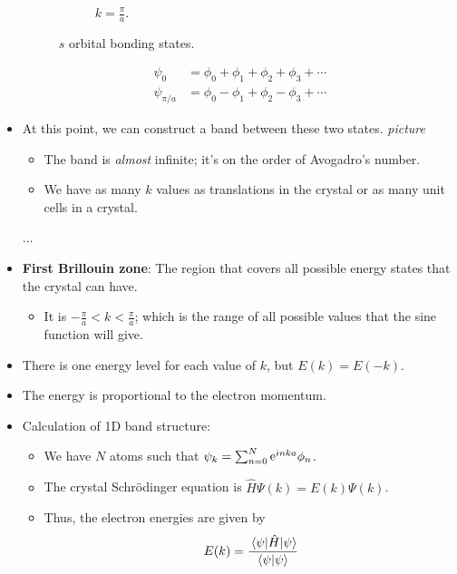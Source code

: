 \documentclass[../notes.tex]{subfiles}
\begin{document}
\begin{itemize}
\begin{figure}[h!]
\begin{subfigure}[b]{0.35\linewidth}
            \caption{$k=\frac{\pi}{a}$.}
            \label{fig:bandBonding-sb}
        \end{subfigure}
        \caption{$s$ orbital bonding states.}
        \label{fig:bandBonding-s}
    \end{figure}
    \begin{align*}
        \psi_0 &= \phi_0+\phi_1+\phi_2+\phi_3+\cdots\\
        \psi_{\pi/a} &= \phi_0-\phi_1+\phi_2-\phi_3+\cdots
    \end{align*}
    \item At this point, we can construct a band between these two states.
    \emph{picture}
    \begin{itemize}
        \item The band is \emph{almost} infinite; it's on the order of Avogadro's number.
        \item We have as many $k$ values as translations in the crystal or as many unit cells in a crystal.
    \end{itemize}
    ...
    \item \textbf{First Brillouin zone}: The region that covers all possible energy states that the crystal can have.
    \begin{itemize}
        \item It is $-\frac{\pi}{a}<k<\frac{\pi}{a}$; which is the range of all possible values that the sine function will give.
    \end{itemize}
    \item There is one energy level for each value of $k$, but $E(k)=E(-k)$.
    \item The energy is proportional to the electron momentum.
    \item Calculation of 1D band structure:
    \begin{itemize}
        \item We have $N$ atoms such that $\psi_k=\sum_{n=0}^N\e[inka]\phi_n$.
        \item The crystal Schr\"{o}dinger equation is $\hat{H}\Psi(k)=E(k)\Psi(k)$.
        \item Thus, the electron energies are given by
        \begin{equation*}
            E(k) = \frac{\ev{\hat{H}}{\psi}}{\braket{\psi}}

\end{equation*}
\end{itemize}
\end{itemize}
\end{document}
